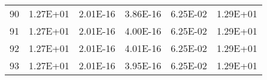 \documentclass[12pt]{article}
\begin{document}
\begin{table}[htbp]
\begin{tabular}{rrrrrr}
    90    & 1.27E+01 & 2.01E-16 & 3.86E-16 & 6.25E-02 & 1.29E+01 \\
    91    & 1.27E+01 & 2.01E-16 & 4.00E-16 & 6.25E-02 & 1.29E+01 \\
    92    & 1.27E+01 & 2.01E-16 & 4.01E-16 & 6.25E-02 & 1.29E+01 \\
    93    & 1.27E+01 & 2.01E-16 & 3.95E-16 & 6.25E-02 & 1.29E+01 \\

\end{tabular}
\end{table}
\end{document}

